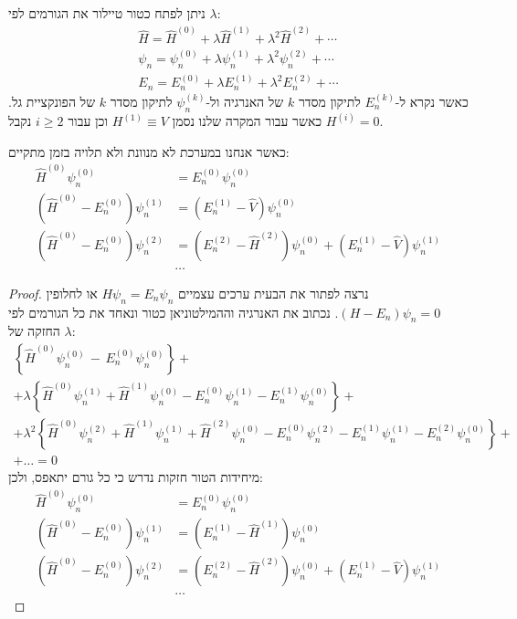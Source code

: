 \documentclass{tstextbook}
\begin{document}
\begin{symbolize}
ניתן לפתח כטור טיילור את הגורמים לפי \(\lambda\):
\begin{gather*}{{\hat{H}}}={{\hat{H}^{(0)}+\lambda\hat{H}^{(1)}+\lambda^{2}\hat{H}^{(2)}+\cdots}}\\ {{\psi_{n}}}={{\psi_{n}^{(0)}+\lambda\psi_{n}^{(1)}+\lambda^{2}\psi_{n}^{(2)}+\cdots}}\\{{E_{n}}}={{E_{n}^{(0)}+\lambda E_{n}^{(1)}+\lambda^{2}E_{n}^{(2)}+\cdots}}
\end{gather*}
כאשר נקרא ל-\(E_{n}^{(k)}\) לתיקון מסדר \(k\) של האנרגיה ול-\(\psi_{n}^{(k)}\) לתיקון מסדר \(k\) של הפונקציית גל. כאשר עבור המקרה שלנו נסמן \(H^{(1)} \equiv V\) וכן עבור \(i\geq 2\) נקבל \(H^{(i)}=0\).

\end{symbolize}
\begin{proposition}
כאשר אנחנו במערכת לא מנוונת ולא תלויה בזמן מתקיים:
$$\begin{aligned}\hat{H}^{(0)}\psi_{n}^{(0)} & =E_{n}^{(0)}\psi_{n}^{(0)} \\\left( \hat{H}^{(0)}-E_{n}^{(0)} \right)\psi_{n}^{(1)} & =\left( E_{n}^{(1)}-\hat{V} \right)\psi_{n}^{(0)} \\\left( \hat{H}^{(0)}-E_n^{(0)} \right)\psi_n^{(2)} & =\left( E_n^{(2)}-\hat{H}^{(2)} \right)\psi_n^{(0)}+\left( E_n^{(1)}-\hat{V} \right)\psi_n^{(1)}\\&\dots
\end{aligned}$$

\end{proposition}
\begin{proof}
נרצה לפתור את הבעית ערכים עצמיים \(H\psi_{n}=E_{n}\psi_{n}\) או לחלופין \((H-E_{n})\psi_{n}=0\).
נכתוב את האנרגיה וההמילטוניאן כטור ונאחד את כל הגורמים לפי החזקה של \(\lambda\):
\begin{gather*}\left\{ \hat{H}^{(0)}\psi_{n}^{(0)}\,-\,E_{n}^{(0)}\psi_{n}^{(0)} \right\}+\\+\lambda\left\{ \hat{H}^{(0)}\psi_{n}^{(1)}+\hat{H}^{(1)}\psi_{n}^{(0)}-E_{n}^{(0)}\psi_{n}^{(1)}-E_{n}^{(1)}\psi_{n}^{(0)} \right\}+\\+\lambda^{2}\left\{ \hat{H}^{(0)}\psi_{n}^{(2)}+\hat{H}^{(1)}\psi_{n}^{(1)}+\hat{H}^{(2)}\psi_{n}^{(0)}-E_{n}^{(0)}\psi_{n}^{(2)}-E_{n}^{(1)}\psi_{n}^{(1)}-E_{n}^{(2)}\psi_{n}^{(0)} \right\}+\\+\dots = 0
\end{gather*}
מיחידות הטור חזקות נדרש כי כל גורם יתאפס, ולכן:
$$\begin{aligned}\hat{H}^{(0)}\psi_{n}^{(0)} & =E_{n}^{(0)}\psi_{n}^{(0)} \\\left( \hat{H}^{(0)}-E_{n}^{(0)} \right)\psi_{n}^{(1)} & =\left( E_{n}^{(1)}-\hat{H}^{(1)} \right)\psi_{n}^{(0)} \\\left( \hat{H}^{(0)}-E_n^{(0)} \right)\psi_n^{(2)} & =\left( E_n^{(2)}-\hat{H}^{(2)} \right)\psi_n^{(0)}+\left( E_n^{(1)}-\hat{V} \right)\psi_n^{(1)}\\&\dots
\end{aligned}$$

\end{proof}
\end{document}
